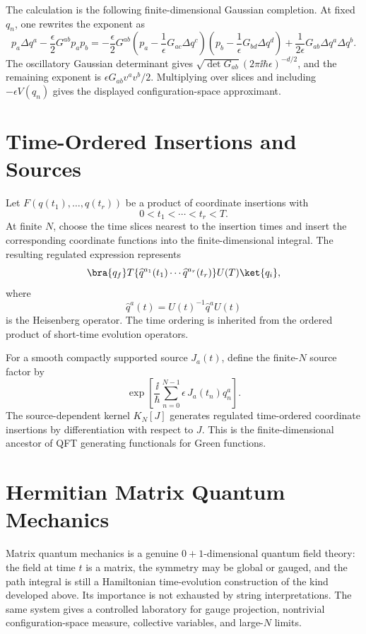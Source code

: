 The calculation is the following finite-dimensional Gaussian completion.  At
fixed \(q_n\), one rewrites the exponent as
\[
  p_a\Delta q^a
  -\frac{\epsilon}{2}G^{ab}p_ap_b
  =
  -\frac{\epsilon}{2}G^{ab}
  \left(p_a-\frac1\epsilon G_{ac}\Delta q^c\right)
  \left(p_b-\frac1\epsilon G_{bd}\Delta q^d\right)
  +
  \frac{1}{2\epsilon}G_{ab}\Delta q^a\Delta q^b .
\]
The oscillatory Gaussian determinant gives
\(\sqrt{\det G_{ab}}(2\pi\ii\hbar\epsilon)^{-d/2}\), and the remaining
exponent is
\(\epsilon G_{ab}v^av^b/2\).  Multiplying over slices and including
\(-\epsilon V(q_n)\) gives the displayed configuration-space approximant.

\section{Time-Ordered Insertions and Sources}

\begin{definition}
\label{def:finite-slice-time-ordered-insertions-source}
Let \(F(q(t_1),\ldots,q(t_r))\) be a product of coordinate insertions with
\[
  0<t_1<\cdots<t_r<T.
\]
At finite \(N\), choose the time slices nearest to the insertion times and
insert the corresponding coordinate functions into the finite-dimensional
integral. The resulting regulated expression represents
\[
  \bra{q_f}T\{\widehat q^{a_1}(t_1)\cdots
  \widehat q^{a_r}(t_r)\}U(T)\ket{q_i},
\]
where
\[
  \widehat q^a(t)
  =
  U(t)^{-1}\widehat q^aU(t)
\]
is the Heisenberg operator. The time ordering is inherited from the ordered
product of short-time evolution operators.

For a smooth compactly supported source \(J_a(t)\), define the finite-\(N\)
source factor by
\[
  \exp\left[
    \frac{\ii}{\hbar}
    \sum_{n=0}^{N-1}\epsilon\,J_a(t_n)q_n^a
  \right].
\]
The source-dependent kernel \(K_N[J]\) generates regulated time-ordered
coordinate insertions by differentiation with respect to \(J\). This is the
finite-dimensional ancestor of QFT generating functionals for Green
functions.
\end{definition}

\section{Hermitian Matrix Quantum Mechanics}
\label{sec:hermitian-matrix-quantum-mechanics}

Matrix quantum mechanics is a genuine \(0+1\)-dimensional quantum field
theory: the field at time \(t\) is a matrix, the symmetry may be global or
gauged, and the path integral is still a Hamiltonian time-evolution
construction of the kind developed above.  Its importance is not exhausted by
string interpretations.  The same system gives a controlled laboratory for
gauge projection, nontrivial configuration-space measure, collective
variables, and large-\(N\) limits.

